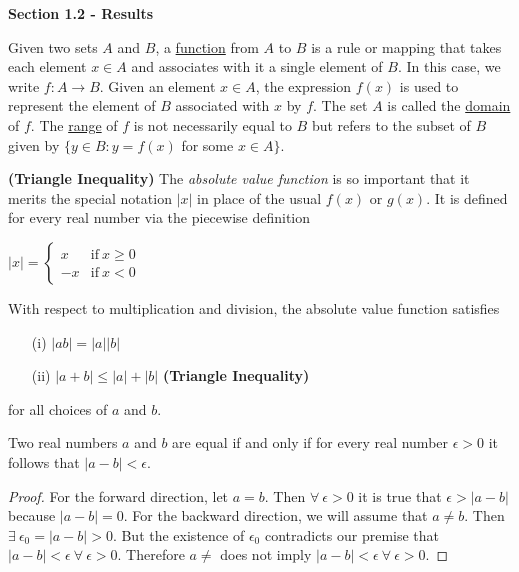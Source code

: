 \documentclass[11pt]{article}
\newcommand{\mytitlecompact}[1]{{

\hfill
{\Large \sffamily \bfseries{#1}}
\hfill
}}
\newenvironment{thm}[1]
    {\renewcommand\theinnercustomthm{#1}\innercustomthm}
    {\endinnercustomthm}
\newenvironment{defn}[1]
    {\renewcommand\theinnercustomdefn{#1}\innercustomdefn\upshape}
    {\endinnercustomdefn}
\newenvironment{exmp}[1]
    {\renewcommand\theinnercustomexmp{#1}\innercustomexmp\upshape}
    {\endinnercustomexmp}
\begin{document}
\mytitlecompact{Section 1.2 - Results}

\begin{defn}{1.2.3}
    Given two sets $A$ and $B$, a \underline{function} from $A$ to $B$ is a rule or mapping that takes each element $x\in A$ and associates with it a single element of $B$. In this case, we write $f:A\to B$. Given an element $x\in A$, the expression $f(x)$ is used to represent the element of $B$ associated with $x$ by $f$. The set $A$ is called the \underline{domain} of $f$. The \underline{range} of $f$ is not necessarily equal to $B$ but refers to the subset of $B$ given by $\{y\in B:y=f(x)$ for some $x\in A\}$.
\end{defn}

\begin{exmp}{1.2.5} \textbf{(Triangle Inequality)} The \emph{absolute value function} is so important that it merits the special notation $|x|$ in place of the usual $f(x)$ or $g(x)$. It is defined for every real number via the piecewise definition
\begin{center}
    $|x|=
    \begin{cases}
        x & \text{if}~x\geq 0 \\
        -x & \text{if}~x<0
    \end{cases}
    $
\end{center}
With respect to multiplication and division, the absolute value function satisfies
\begin{enumerate}
    \item[(i)] $|ab|=|a||b|$
    \item[(ii)] $|a+b|\leq |a|+|b|$ \textbf{(Triangle Inequality)}
\end{enumerate}
for all choices of $a$ and $b$.
\end{exmp}

\begin{thm}{1.2.6}
    Two real numbers $a$ and $b$ are equal if and only if for every real number $\epsilon>0$ it follows that $|a-b|<\epsilon$.
\end{thm}
\begin{proof}
    For the forward direction, let $a=b$. Then $\forall~\epsilon>0$ it is true that $\epsilon>|a-b|$ because $|a-b|=0$. For the backward direction, we will assume that $a\neq b$. Then $\exists~\epsilon_0=|a-b|>0$. But the existence of $\epsilon_0$ contradicts our premise that $|a-b|<\epsilon~\forall~\epsilon>0$. Therefore $a\neq$ does not imply $|a-b|<\epsilon~\forall~\epsilon>0$.
\end{proof}
\end{document}
